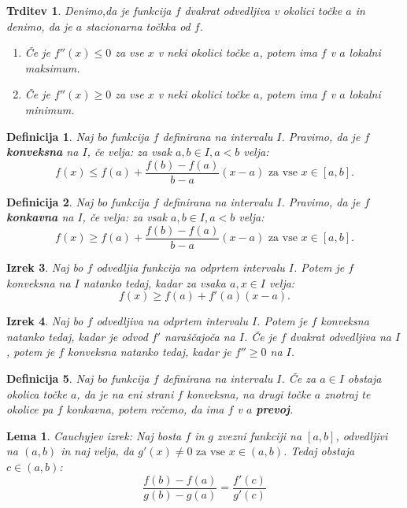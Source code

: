 \documentclass[a4paper,12pt]{report}
\newtheorem{izrek}{Izrek}[section]
\newtheorem{lema}{Lema}
\newtheorem{definicija}[izrek]{Definicija}
\newtheorem{trditev}{Trditev}
\begin{document}
\begin{trditev}
    Denimo,da je funkcija $f$ dvakrat odvedljiva v okolici točke $a$ in denimo, da je $a$ stacionarna točkka od $f$.
    \begin{enumerate}
        \item Če je $f''(x) \leq 0$ za vse $x$ v neki okolici točke $a$, potem ima $f$ v $a$ lokalni maksimum.
        \item Če je $f''(x) \geq 0$ za vse $x$ v neki okolici točke $a$, potem ima $f$ v $a$ lokalni minimum.
    \end{enumerate}
\end{trditev}

\begin{definicija}
    Naj bo funkcija $f$ definirana na intervalu $I$. Pravimo, da je $f$ \textbf{konveksna} na $I$, če velja: za vsak $a,b \in I, a < b$ velja: 
    $$f(x) \leq f(a) + \frac{f(b)-f(a)}{b-a} (x-a) \text{ za vse } x \in [a,b].$$
\end{definicija}

\begin{definicija}
    Naj bo funkcija $f$ definirana na intervalu $I$. Pravimo, da je $f$ \textbf{konkavna} na $I$, če velja: za vsak $a,b \in I, a < b$ velja: 
    $$f(x) \geq f(a) + \frac{f(b)-f(a)}{b-a} (x-a) \text{ za vse } x \in [a,b].$$
\end{definicija}

\begin{izrek}
    Naj bo $f$ odvedljia funkcija na odprtem intervalu $I$. Potem je $f$ konveksna na $I$ natanko tedaj, 
    kadar za vsaka $a,x \in I$ velja: $$f(x) \geq f(a) + f'(a)(x-a).$$
\end{izrek}

\begin{izrek}
    Naj bo $f$ odvedljiva na odprtem intervalu $I$. Potem je $f$ konveksna natanko tedaj, 
    kadar je odvod $f'$ naraščajoča na $I$. Če je $f$ dvakrat odvedljiva na $I$, potem je $f$ konveksna natanko tedaj, 
    kadar je $f'' \geq 0$ na $I$.
\end{izrek}

\begin{definicija}
    Naj bo funkcija $f$ definirana na intervalu $I$. Če za $a \in I$ obstaja okolica točke $a$, da je na eni strani $f$ 
    konveksna, na drugi točke $a$ znotraj te okolice pa $f$ konkavna, potem rečemo, da ima $f$ v $a$ \textbf{prevoj}. 
\end{definicija}

\begin{lema}
    Cauchyjev izrek: Naj bosta $f$ in $g$ zvezni funkciji na $[a,b]$, odvedljivi na $(a,b)$ in naj velja, da  
    $g'(x) \neq 0 \text{ za vse } x \in (a,b)$. Tedaj obstaja $c \in  (a,b)$: $$\frac{f(b)-f(a)}{g(b)-g(a)} = \frac{f'(c)}{g'(c)}$$
\end{lema}
\end{document}
